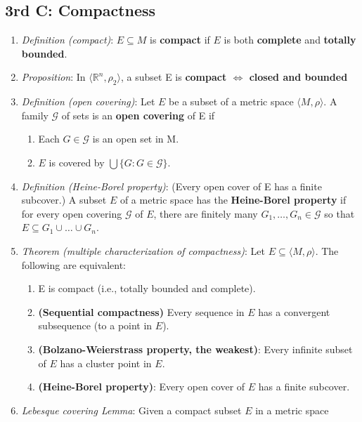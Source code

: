 \documentclass[10pt]{article}
\begin{document}
\begin{multicols*}{3}
	\section{3rd C: Compactness}
	\begin{enumerate}
		\item \emph{Definition (compact)}: \(E \subseteq M\) is \textbf{compact} if \(E\) is both
		      \textbf{complete} and \textbf{totally bounded}.
		\item \emph{Proposition}: In \(\langle\mathbb{R}^n, \rho_2\rangle\), a subset E is
		      \textbf{compact \(\iff\) closed and bounded}
		\item \emph{Definition (open covering)}: Let \(E\) be a subset of a metric space
		      \(\langle M,\rho\rangle\). A family \(\mathcal{G}\) of sets is an
		      \textbf{open
			      covering} of E if
		      \begin{enumerate}
			      \item Each \(G\in\mathcal{G}\) is an open set in M.
			      \item \(E\) is covered by \(\bigcup \{G:G\in\mathcal{G}\}\).
		      \end{enumerate}
		\item \emph{Definition (Heine-Borel property)}: (Every open cover of E has a finite
		      subcover.) A subset \(E\) of a metric space has the
		      \textbf{Heine-Borel property} if for every open covering \(\mathcal{G}\) of \(E\),
		      there are finitely many \(G_1,\dots,G_n\in\mathcal{G}\) so that \(E\subseteq
		      G_1\cup\dots\cup G_n\).
		\item \emph{Theorem (multiple characterization of compactness)}: Let \(E \subseteq
		      \langle M,\rho\rangle\). The following are equivalent:
		      \begin{enumerate}
			      \item E is compact (i.e., totally bounded and complete).
			      \item \textbf{(Sequential compactness)} Every sequence in \(E\) has a convergent
			            subsequence (to a point in \(E\)).
			      \item \textbf{(Bolzano-Weierstrass property, the weakest)}: Every infinite subset of
			            \(E\) has a cluster point in \(E\).
			      \item \textbf{(Heine-Borel property)}: Every open cover of \(E\) has a finite subcover.
		      \end{enumerate}
		\item \emph{Lebesque covering Lemma}: Given a compact subset \(E\) in a metric space

\end{enumerate}
\end{multicols*}
\end{document}
